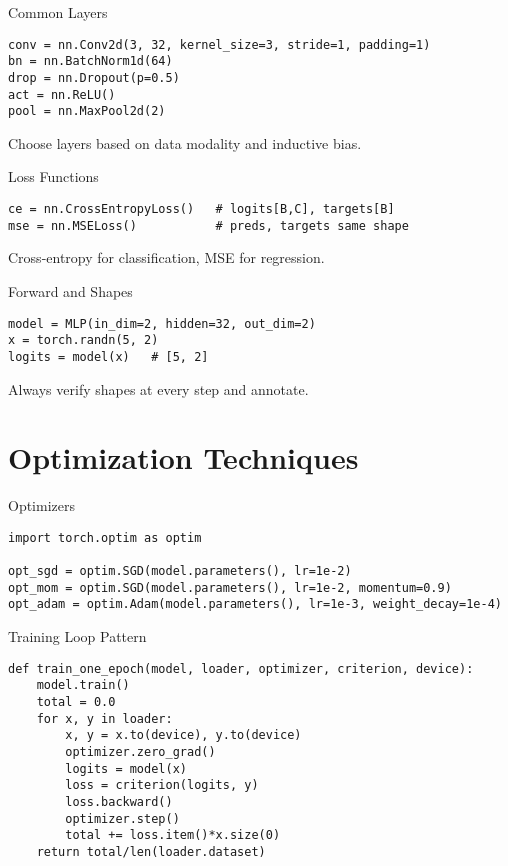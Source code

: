 \documentclass[aspectratio=169,10pt]{beamer}
\begin{document}
\begin{frame}[fragile]{Common Layers}
\begin{lstlisting}
conv = nn.Conv2d(3, 32, kernel_size=3, stride=1, padding=1)
bn = nn.BatchNorm1d(64)
drop = nn.Dropout(p=0.5)
act = nn.ReLU()
pool = nn.MaxPool2d(2)
\end{lstlisting}
Choose layers based on data modality and inductive bias.
\end{frame}

\begin{frame}[fragile]{Loss Functions}
\begin{lstlisting}
ce = nn.CrossEntropyLoss()   # logits[B,C], targets[B]
mse = nn.MSELoss()           # preds, targets same shape
\end{lstlisting}
Cross-entropy for classification, MSE for regression.
\end{frame}

\begin{frame}[fragile]{Forward and Shapes}
\begin{lstlisting}
model = MLP(in_dim=2, hidden=32, out_dim=2)
x = torch.randn(5, 2)
logits = model(x)   # [5, 2]
\end{lstlisting}
Always verify shapes at every step and annotate.
\end{frame}

\section{Optimization Techniques}

\begin{frame}[fragile]{Optimizers}
\begin{lstlisting}
import torch.optim as optim

opt_sgd = optim.SGD(model.parameters(), lr=1e-2)
opt_mom = optim.SGD(model.parameters(), lr=1e-2, momentum=0.9)
opt_adam = optim.Adam(model.parameters(), lr=1e-3, weight_decay=1e-4)
\end{lstlisting}
\end{frame}

\begin{frame}[fragile]{Training Loop Pattern}
\begin{lstlisting}
def train_one_epoch(model, loader, optimizer, criterion, device):
    model.train()
    total = 0.0
    for x, y in loader:
        x, y = x.to(device), y.to(device)
        optimizer.zero_grad()
        logits = model(x)
        loss = criterion(logits, y)
        loss.backward()
        optimizer.step()
        total += loss.item()*x.size(0)
    return total/len(loader.dataset)
\end{lstlisting}
\end{frame}
\end{document}
